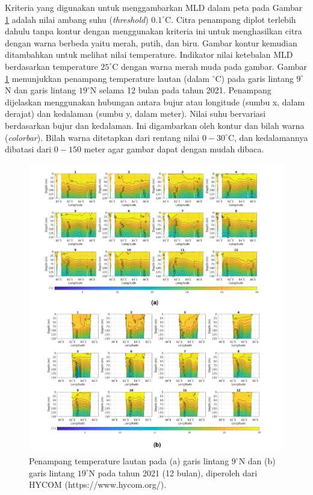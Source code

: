 \begin{spacing}{1.5}
	Kriteria yang digunakan untuk menggambarkan MLD dalam peta pada Gambar \ref{fig:mld} adalah nilai ambang suhu (\textit{threshold}) $0.1^\circ$C. Citra penampang diplot terlebih dahulu tanpa kontur dengan menggunakan kriteria ini untuk menghasilkan citra dengan warna berbeda yaitu merah, putih, dan biru. Gambar kontur kemudian ditambahkan untuk melihat nilai temperature. Indikator nilai ketebalan MLD berdasarkan temperature $25^\circ$C dengan warna merah muda pada gambar. Gambar \ref{fig:mld} menunjukkan penampang temperature lautan (dalam $^\circ$C) pada garis lintang $9^\circ$N dan garis lintang $19^\circ$N selama 12 bulan pada tahun 2021. Penampang dijelaskan menggunakan hubungan antara bujur atau longitude (sumbu x, dalam derajat) dan kedalaman (sumbu y, dalam meter). Nilai suhu bervariasi berdasarkan bujur dan kedalaman. Ini digambarkan oleh kontur dan bilah warna (\textit{colorbar}). Bilah warna ditetapkan dari rentang nilai $0 - 30^\circ$C, dan kedalamannya dibatasi dari $0-150$ meter agar gambar dapat dengan mudah dibaca.
	
	\begin{figure}[H]
		\centering
		\includegraphics[width=16cm]{contents/final_figure/Figure_4}
		\caption{Penampang temperature lautan pada (a) garis lintang $9^\circ$N dan (b) garis lintang $19^\circ$N pada tahun 2021 (12 bulan), diperoleh dari HYCOM (https://www.hycom.org/).}
		\label{fig:mld}
	\end{figure}
	

\end{spacing}
